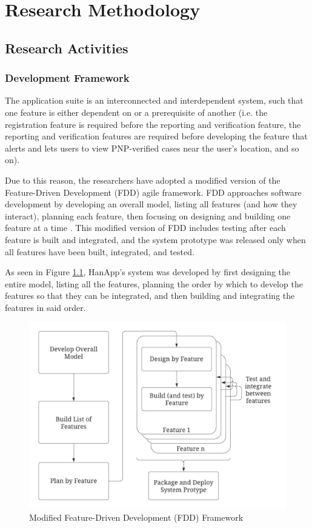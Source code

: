 \chapter{Research Methodology}

\section{Research Activities}
\subsection{Development Framework}
The application suite is an interconnected and interdependent system, such that one feature is either dependent on or a prerequisite of another (i.e. the registration feature is required before the reporting and verification feature, the reporting and verification features are required before developing the feature that alerts and lets users to view PNP-verified cases near the user’s location, and so on).

Due to this reason, the researchers have adopted a modified version of the Feature-Driven Development (FDD) agile framework. FDD approaches software development by developing an overall model, listing all features (and how they interact), planning each feature, then focusing on designing and building one feature at a time \cite{productplan2022}. This modified version of FDD includes testing after each feature is built and integrated, and the system prototype was released only when all features have been built, integrated, and tested.

As seen in Figure \ref{fig:FDDFramework}, HanApp’s system was developed by first designing the entire model, listing all the features, planning the order by which to develop the features so that they can be integrated, and then building and integrating the features in said order.
\begin{figure}[!h]
    \centering
    \includegraphics[width=\textwidth]{figures/Chapter3/Chapt3_DevFramework.jpeg}
    \caption{Modified Feature-Driven Development (FDD) Framework}
    \label{fig:FDDFramework}
\end{figure}

